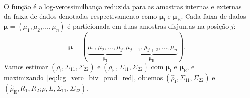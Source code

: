O função é a log-verossimilhança reduzida para as amostras internas e externas da faixa de dados denotadas respectivamento como $\bm \mu_\text{I}$ e $\bm \mu_\text{E}$. Cada faixa de dados $\bm \mu = (\mu_1,\mu_2,\dots,\mu_n)$ é particionada em duas amostras disjuntas na posição $j$:  
$$
\bm \mu = (\underbrace{\mu_1,\mu_2,\dots,\mu_j}_{\bm \mu_\text{I}}, 
\underbrace{\mu_{j+1}, \mu_{j+2},\dots,\mu_n}_{\bm \mu_\text{E}}).
$$
Vamos estimar $(\rho_\text{I}, \Sigma_{11}, \Sigma_{22} )$ e $(\rho_\text{E}, \Sigma_{11}, \Sigma_{22})$ com $\bm \mu_\text{I}$ e $\bm \mu_\text{E}$, e maximizando~\eqref{eq:log_vero_biv_prod_red}, obtemos $(\widehat{\rho}_\text{I}, \Sigma_{11}, \Sigma_{22})$ e $(\widehat{\rho}_\text{E}, R_1, R_2;\rho, L, \Sigma_{11}, \Sigma_{22})$.

